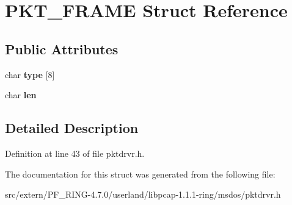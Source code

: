 \hypertarget{struct_p_k_t___f_r_a_m_e}{
\section{PKT\_\-FRAME Struct Reference}
\label{struct_p_k_t___f_r_a_m_e}
}
\subsection*{Public Attributes}
\begin{DoxyCompactItemize}
\item 
\hypertarget{struct_p_k_t___f_r_a_m_e_a7e22a019a517828115920e30c7362fb0}{
char {\bfseries type} \mbox{[}8\mbox{]}}
\label{struct_p_k_t___f_r_a_m_e_a7e22a019a517828115920e30c7362fb0}

\item 
\hypertarget{struct_p_k_t___f_r_a_m_e_ae7e7860f832b71b834317eb3b49349b9}{
char {\bfseries len}}
\label{struct_p_k_t___f_r_a_m_e_ae7e7860f832b71b834317eb3b49349b9}

\end{DoxyCompactItemize}


\subsection{Detailed Description}


Definition at line 43 of file pktdrvr.h.



The documentation for this struct was generated from the following file:\begin{DoxyCompactItemize}
\item 
src/extern/PF\_\-RING-\/4.7.0/userland/libpcap-\/1.1.1-\/ring/msdos/pktdrvr.h\end{DoxyCompactItemize}

